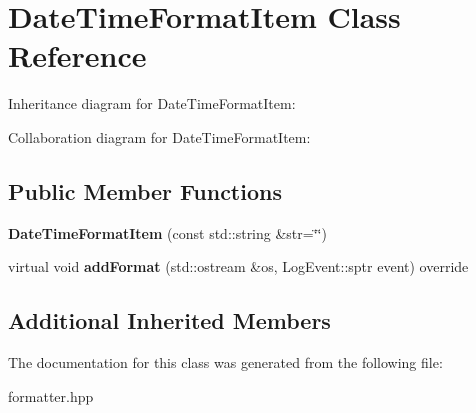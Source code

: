 \hypertarget{classDateTimeFormatItem}{}\section{Date\+Time\+Format\+Item Class Reference}
\label{classDateTimeFormatItem}


Inheritance diagram for Date\+Time\+Format\+Item\+:


Collaboration diagram for Date\+Time\+Format\+Item\+:
\subsection*{Public Member Functions}
\begin{DoxyCompactItemize}
\item 
\mbox{\label{classDateTimeFormatItem_a65d786622fc83aeaca0fc3ddbba01880}} 
{\bfseries Date\+Time\+Format\+Item} (const std\+::string \&str=\char`\"{}\char`\"{})
\item 
\mbox{\label{classDateTimeFormatItem_a872b0266871e9df9bc40dd38b0f839c2}} 
virtual void {\bfseries add\+Format} (std\+::ostream \&os, Log\+Event\+::sptr event) override
\end{DoxyCompactItemize}
\subsection*{Additional Inherited Members}


The documentation for this class was generated from the following file\+:\begin{DoxyCompactItemize}
\item 
formatter.\+hpp\end{DoxyCompactItemize}
